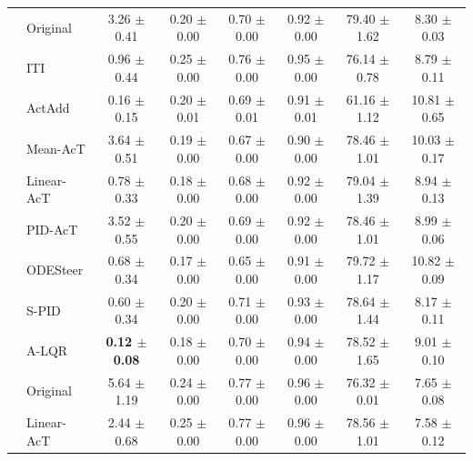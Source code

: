 \documentclass{article}
\theoremstyle{plain}
\theoremstyle{definition}
\theoremstyle{remark}
\begin{document}
\begin{table}[H]
\begin{threeparttable}
\begin{tabular}{ll|>{}c|ccc|c|c}
    & Original & 3.26 {\tiny $\pm$0.41} & 0.20 {\tiny $\pm$0.00} & 0.70 {\tiny $\pm$0.00} & 0.92 {\tiny $\pm$0.00} & 79.40 {\tiny $\pm$1.62} & 8.30 {\tiny $\pm$0.03} \\
    \cmidrule(lr){2-8}
    & ITI & 0.96 {\tiny $\pm$0.44} & 0.25 {\tiny $\pm$0.00} & 0.76 {\tiny $\pm$0.00} & 0.95 {\tiny $\pm$0.00} & 76.14 {\tiny $\pm$0.78} & 8.79 {\tiny $\pm$0.11} \\
    & ActAdd & 0.16 {\tiny $\pm$0.15} & 0.20 {\tiny $\pm$0.01} & 0.69 {\tiny $\pm$0.01} & 0.91 {\tiny $\pm$0.01} & 61.16 {\tiny $\pm$1.12} & 10.81 {\tiny $\pm$0.65} \\
    & Mean-AcT & 3.64 {\tiny $\pm$0.51} & 0.19 {\tiny $\pm$0.00} & 0.67 {\tiny $\pm$0.00} & 0.90 {\tiny $\pm$0.00} & 78.46 {\tiny $\pm$1.01} & 10.03 {\tiny $\pm$0.17} \\
    & Linear-AcT & 0.78 {\tiny $\pm$0.33} & 0.18 {\tiny $\pm$0.00} & 0.68 {\tiny $\pm$0.00} & 0.92 {\tiny $\pm$0.00} & 79.04 {\tiny $\pm$1.39} & 8.94 {\tiny $\pm$0.13} \\
    & PID-AcT & 3.52 {\tiny $\pm$0.55} & 0.20 {\tiny $\pm$0.00} & 0.69 {\tiny $\pm$0.00} & 0.92 {\tiny $\pm$0.00} & 78.46 {\tiny $\pm$1.01} & 8.99 {\tiny $\pm$0.06} \\
    & ODESteer & 0.68 {\tiny $\pm$0.34} & 0.17 {\tiny $\pm$0.00} & 0.65 {\tiny $\pm$0.00} & 0.91 {\tiny $\pm$0.00} & 79.72 {\tiny $\pm$1.17} & 10.82 {\tiny $\pm$0.09 } \\
    & S-PID & 0.60 {\tiny $\pm$0.34} & 0.20 {\tiny $\pm$0.00} & 0.71 {\tiny $\pm$0.00} & 0.93 {\tiny $\pm$0.00} &  78.64 {\tiny $\pm$1.44} & 8.17 {\tiny $\pm$0.11} \\
    & A-LQR & \textbf{0.12 {\tiny $\pm$0.08}} & 0.18 {\tiny $\pm$0.00} & 0.70 {\tiny $\pm$0.00} & 0.94 {\tiny $\pm$0.00} & 78.52 {\tiny $\pm$1.65} & 9.01 {\tiny $\pm$0.10} \\

    \midrule
    
    & Original 
    & 5.64 {\tiny $\pm$1.19} 
    & 0.24 {\tiny $\pm$0.00}
    & 0.77 {\tiny $\pm$0.00} 
    & 0.96 {\tiny $\pm$0.00}
    & 76.32 {\tiny $\pm$0.01} 
    & 7.65 {\tiny $\pm$0.08} \\
    \cmidrule(lr){2-8}


    & Linear-AcT 
    & 2.44 {\tiny $\pm$0.68} 
    & 0.25 {\tiny $\pm$0.00}
    & 0.77 {\tiny $\pm$0.00} 
    & 0.96 {\tiny $\pm$0.00}
    & 78.56 {\tiny $\pm$1.01} 
    & 7.58 {\tiny $\pm$0.12} \\
    

\end{tabular}
\end{threeparttable}
\end{table}
\end{document}
